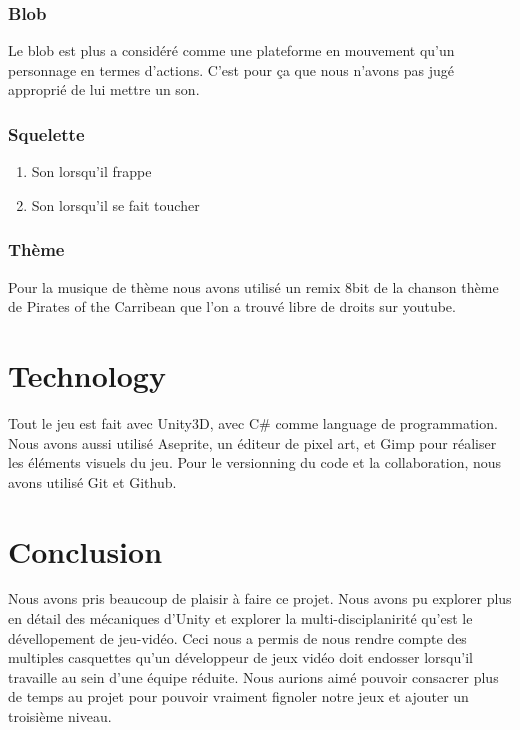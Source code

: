 \documentclass{prologArticle}
\begin{document}
\subsubsection{Blob}
Le blob est plus a considéré comme une plateforme en mouvement qu'un personnage en termes d'actions. C'est pour ça que nous n'avons pas jugé approprié de lui mettre un son.

\subsubsection{Squelette}
\begin{enumerate}
    \item Son lorsqu'il frappe
    \item Son lorsqu'il se fait toucher
\end{enumerate}

\subsubsection{Thème}
Pour la musique de thème nous avons utilisé un remix 8bit de la chanson thème de Pirates of the Carribean que l'on a trouvé libre de droits sur youtube.


\section{Technology}
Tout le jeu est fait avec Unity3D, avec C\# comme language de programmation. Nous avons aussi utilisé Aseprite, un éditeur de pixel art, et Gimp pour réaliser les éléments visuels du jeu. Pour le versionning du code et la collaboration, nous avons utilisé Git et Github.


\section{Conclusion}
Nous avons pris beaucoup de plaisir à faire ce projet. Nous avons pu explorer plus en détail des mécaniques d'Unity et explorer la multi-disciplanirité qu'est le dévellopement de jeu-vidéo. Ceci nous a permis de nous rendre compte des multiples casquettes qu'un développeur de jeux vidéo doit endosser lorsqu'il travaille au sein d'une équipe réduite. Nous aurions aimé pouvoir consacrer plus de temps au projet pour pouvoir vraiment fignoler notre jeux et ajouter un troisième niveau.
\end{document}
